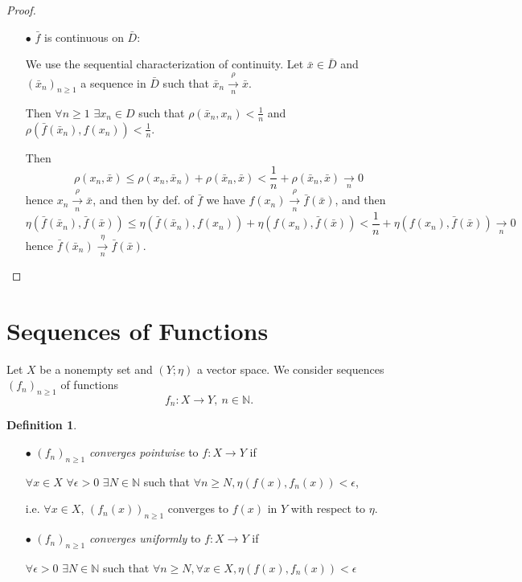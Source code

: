 \documentclass[12pt]{amsbook}
\theoremstyle{definition}
\newtheorem{definition}[theorem]{Definition}
\newcommand{\NN}{{\mathbb N}}
\newcommand{\ra}{\rightarrow} %
\begin{document}
\begin{proof}
\begin{itemize}
\begin{itemize}
\item[$\bullet$] $\bar f$ is continuous on $\bar D$:

We use the sequential characterization of continuity. Let $\bar x \in \bar D$ and $(\bar x_n)_{n \geq 1}$ a sequence in $\bar D$ such that $\bar x_n \xrightarrow[n]{\rho} \bar x$.

Then $\forall n \geq 1$ $\exists x_n \in D$ such that $\rho(\bar x_n, x_n) < \frac{1}{n}$ and $\rho(\bar f(\bar x_n), f(x_n)) < \frac{1}{n}$. %

Then
\begin{equation*}
\rho(x_n, \bar x) \leq \rho(x_n, \bar x_n) + \rho(\bar x_n, \bar x) < \frac{1}{n} + \rho(\bar x_n, \bar x) \xrightarrow[n]{} 0
\end{equation*}
hence $x_n \xrightarrow[n]\rho \bar x$, and then by def. of $\bar f$ we have $f(x_n) \xrightarrow[n]\rho \bar f(\bar x)$, and then
\begin{equation*}
\eta(\bar f(\bar x_n), \bar f(\bar x)) \leq \eta(\bar f(\bar x_n), f(x_n)) + \eta(f(x_n), \bar f(\bar x)) < \frac{1}{n} + \eta(f(x_n), \bar f(\bar x)) \xrightarrow[n]{} 0
\end{equation*}
hence $\bar f(\bar x_n) \xrightarrow[n]\eta \bar f(\bar x)$.
\end{itemize}
\end{itemize}
\end{proof}

\section{Sequences of Functions}

Let $X$ be a nonempty set and $(Y; \eta)$ a vector space. We consider sequences $(f_n)_{n \geq 1}$ of functions
\begin{equation*} f_n: X \ra Y, \ n \in \NN. \end{equation*}

\begin{definition} \
\begin{itemize}
\item[$\bullet$] $(f_n)_{n \geq 1}$ \emph{converges pointwise} to $f: X \ra Y$ if 

$\forall x \in X$ $\forall \epsilon > 0$ $\exists N \in \NN$ such that $\forall n \geq N, \eta(f(x),f_n(x)) < \epsilon$,

i.e. $\forall x \in X$, $(f_n(x))_{n \geq 1}$ converges to $f(x)$ in $Y$ with respect to $\eta$.

\item[$\bullet$] $(f_n)_{n \geq 1}$ \emph{converges uniformly} to $f: X \ra Y$ if 

$\forall \epsilon > 0$ $\exists N \in \NN$ such that $\forall n \geq N, \forall x \in X, \eta(f(x),f_n(x)) < \epsilon$
\end{itemize}
\end{definition}
\end{document}
